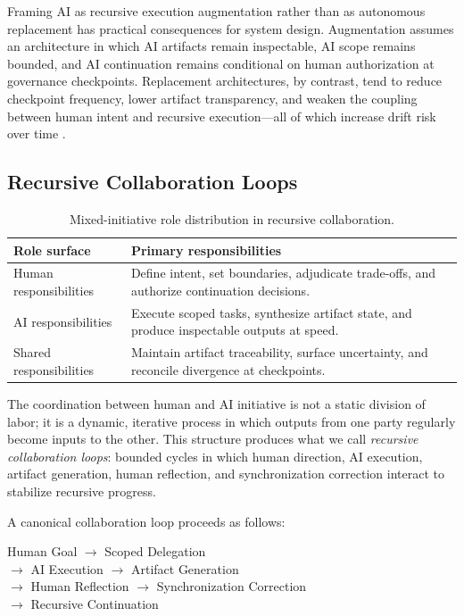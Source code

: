 Framing AI as recursive execution augmentation rather than as autonomous replacement has practical consequences for system design. Augmentation assumes an architecture in which AI artifacts remain inspectable, AI scope remains bounded, and AI continuation remains conditional on human authorization at governance checkpoints. Replacement architectures, by contrast, tend to reduce checkpoint frequency, lower artifact transparency, and weaken the coupling between human intent and recursive execution---all of which increase drift risk over time \cite{Shneiderman2020HCAI,Amershi2014InteractiveML}.

\subsection{Recursive Collaboration Loops}

\begin{table}[H]
  \centering
  \small
  \caption{Mixed-initiative role distribution in recursive collaboration.}
  \label{tab:mixed-initiative-roles}
  \begin{tabularx}{\linewidth}{l X}
    \toprule
    \textbf{Role surface} & \textbf{Primary responsibilities} \\
    \midrule
    Human responsibilities & Define intent, set boundaries, adjudicate trade-offs, and authorize continuation decisions. \\
    AI responsibilities & Execute scoped tasks, synthesize artifact state, and produce inspectable outputs at speed. \\
    Shared responsibilities & Maintain artifact traceability, surface uncertainty, and reconcile divergence at checkpoints. \\
    \bottomrule
  \end{tabularx}
\end{table}

The coordination between human and AI initiative is not a static division of labor; it is a dynamic, iterative process in which outputs from one party regularly become inputs to the other. This structure produces what we call \textit{recursive collaboration loops}: bounded cycles in which human direction, AI execution, artifact generation, human reflection, and synchronization correction interact to stabilize recursive progress.

A canonical collaboration loop proceeds as follows:
\begin{center}
Human Goal $\rightarrow$ Scoped Delegation\\
$\rightarrow$ AI Execution $\rightarrow$ Artifact Generation\\
$\rightarrow$ Human Reflection $\rightarrow$ Synchronization Correction\\
$\rightarrow$ Recursive Continuation
\end{center}

